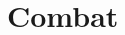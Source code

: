 \racechart

\chapter{Combat}

\begin{multicols}{2}

\initiativechart

\columnbreak

\armourchart

\moralechart

\end{multicols}

\pagebreak

\weaponschart


